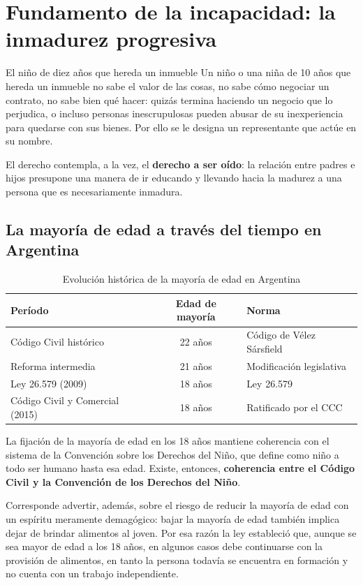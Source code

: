 \documentclass[12pt,oneside]{book}
\begin{document}
\section{Fundamento de la incapacidad: la inmadurez progresiva}

\begin{example}{El niño de diez años que hereda un inmueble}
Un niño o una niña de 10 años que hereda un inmueble no sabe el valor de las cosas, no sabe cómo negociar un contrato, no sabe bien qué hacer: quizás termina haciendo un negocio que lo perjudica, o incluso personas inescrupulosas pueden abusar de su inexperiencia para quedarse con sus bienes. Por ello se le designa un representante que actúe en su nombre.
\end{example}

El derecho contempla, a la vez, el \textbf{derecho a ser oído}: la relación entre padres e hijos presupone una manera de ir educando y llevando hacia la madurez a una persona que es necesariamente inmadura.

\subsection{La mayoría de edad a través del tiempo en Argentina}

\begin{table}[H]
\centering
\caption{Evolución histórica de la mayoría de edad en Argentina}
\begin{tabularx}{\textwidth}{Xcl}
\toprule
\textbf{Período} & \textbf{Edad de mayoría} & \textbf{Norma} \\
\midrule
Código Civil histórico & 22 años & Código de Vélez Sársfield \\
Reforma intermedia & 21 años & Modificación legislativa \\
Ley 26.579 (2009) & 18 años & Ley 26.579 \\
Código Civil y Comercial (2015) & 18 años & Ratificado por el CCC \\
\bottomrule
\end{tabularx}
\end{table}

La fijación de la mayoría de edad en los 18 años mantiene coherencia con el sistema de la Convención sobre los Derechos del Niño, que define como niño a todo ser humano hasta esa edad. Existe, entonces, \textbf{coherencia entre el Código Civil y la Convención de los Derechos del Niño}.

Corresponde advertir, además, sobre el riesgo de reducir la mayoría de edad con un espíritu meramente demagógico: bajar la mayoría de edad también implica dejar de brindar alimentos al joven. Por esa razón la ley estableció que, aunque se sea mayor de edad a los 18 años, en algunos casos debe continuarse con la provisión de alimentos, en tanto la persona todavía se encuentra en formación y no cuenta con un trabajo independiente.
\end{document}
